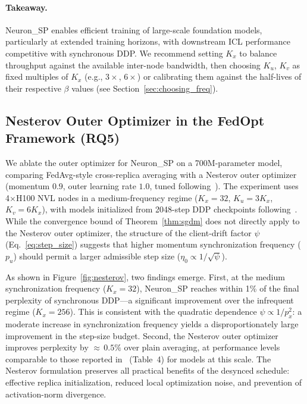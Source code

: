 \documentclass{article}
\begin{document}
\paragraph{Takeaway.}
Neuron\_SP enables efficient training of large-scale foundation models,
particularly at extended training horizons, with downstream ICL
performance competitive with synchronous DDP. We recommend setting $K_x$
to balance throughput against the available inter-node bandwidth, then
choosing $K_u$, $K_v$ as fixed multiples of $K_x$ (e.g., $3\times$,
$6\times$) or calibrating them against the half-lives of their respective
$\beta$ values (see Section~\ref{sec:choosing_freq}).

\subsection{Nesterov Outer Optimizer in the FedOpt Framework (RQ5)}
\label{sec:rq5}

We ablate the outer optimizer for Neuron\_SP on a 700M-parameter model,
comparing FedAvg-style cross-replica averaging with a Nesterov outer
optimizer (momentum $0.9$, outer learning rate $1.0$, tuned
following~\citet{charles2025communication}). The experiment uses
4$\times$H100 NVL nodes in a medium-frequency regime
($K_x = 32$, $K_u = 3K_x$, $K_v = 6K_x$), with models initialized from
2048-step DDP checkpoints following~\citet{charles2025communication}.
While the convergence bound of Theorem~\ref{thm:sgdm} does not directly
apply to the Nesterov outer optimizer, the structure of the
client-drift factor $\psi$ (Eq.~\ref{eq:step_size}) suggests that
higher momentum synchronization frequency ($p_u$) should permit a
larger admissible step size ($\eta_0 \propto 1/\sqrt{\psi}$).

As shown in Figure~\ref{fig:nesterov}, two findings emerge.
First, at the medium synchronization frequency ($K_x = 32$), Neuron\_SP
reaches within 1\% of the final perplexity of synchronous DDP---a
significant improvement over the infrequent regime ($K_x = 256$).
This is consistent with the quadratic dependence $\psi \propto 1/p_x^2$:
a moderate increase in synchronization frequency yields a
disproportionately large improvement in the step-size budget.
Second, the Nesterov outer optimizer improves perplexity by
${\approx}\,0.5\%$ over plain averaging, at performance levels comparable
to those reported in~\citet{charles2025communication} (Table~4) for
models at this scale. The Nesterov formulation preserves all practical
benefits of the desynced schedule: effective replica initialization,
reduced local optimization noise, and prevention of activation-norm
divergence.
\end{document}
